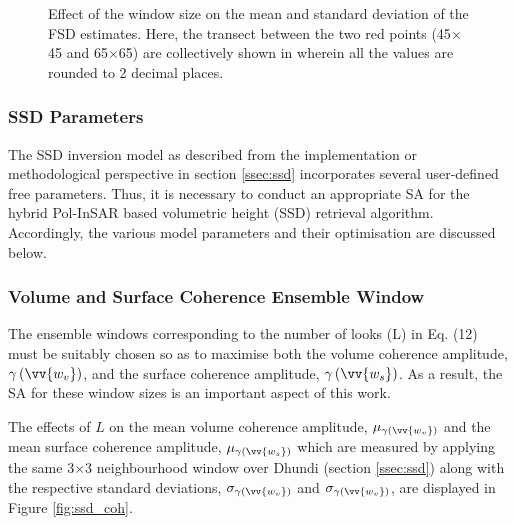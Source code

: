 \documentclass[review]{elsarticle}
\numberwithin{equation}{section}
\numberwithin{figure}{section}
\numberwithin{table}{section}
\begin{document}
\begin{figure}[htb]
\begin{subfigure}[t]{0.49\textwidth}
        \caption{}
        \label{subfig:fwindow_transect}
    \end{subfigure}
    \caption{Effect of the window size on the  mean and  standard deviation of the FSD estimates. Here, the transect between the two red points (45$\times$45 and 65$\times$65) are collectively shown in  wherein all the values are rounded to 2 decimal places.}
    \label{fig:fsd_res}
\end{figure}

\subsubsection{SSD Parameters}
\label{sssec:ssd_param}

The SSD inversion model as described from the implementation or methodological perspective in section \ref{ssec:ssd} incorporates several user-defined free parameters. Thus, it is necessary to conduct an appropriate SA for the hybrid Pol-InSAR based volumetric height (SSD) retrieval algorithm. Accordingly, the various model parameters and their optimisation are discussed below.

\subsubsection*{Volume and Surface Coherence Ensemble Window}

The ensemble windows corresponding to the number of looks (L) in Eq. (12) must be suitably chosen so as to maximise both the volume coherence amplitude, $\gamma\left(\vv{w_v}\right)$, and the surface coherence amplitude, $\gamma\left(\vv{w_s}\right)$. As a result, the SA for these window sizes is an important aspect of this work.

The effects of $L$ on the mean volume coherence amplitude, $\mu_{\gamma\left(\vv{w_v}\right)}$ and the mean surface coherence
amplitude, $\mu_{\gamma\left(\vv{w_s}\right)}$ which are measured by applying the same 3$\times$3 neighbourhood window over Dhundi (section \ref{ssec:ssd}) along with the respective standard deviations, $\sigma_{\gamma\left(\vv{w_v}\right)}$ and $\sigma_{\gamma\left(\vv{w_v}\right)}$, are displayed in Figure \ref{fig:ssd_coh}. 
\end{document}
